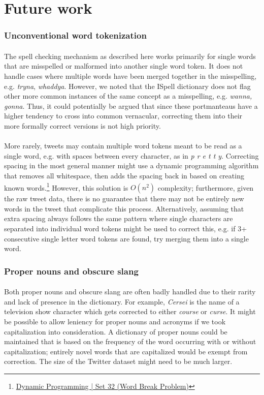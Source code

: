 \documentclass[twocolumn,10pt]{article}
\begin{document}
\section*{Future work}
\subsubsection*{Unconventional word tokenization}
\paragraph{} The spell checking mechanism as described here works primarily for single words that are misspelled or malformed into another single word token. It does not handle cases where multiple words have been merged together in the misspelling, e.g. \textit{tryna}, \textit{whaddya}. However, we noted that the ISpell dictionary does not flag other more common instances of the same concept as a misspelling, e.g. \textit{wanna, gonna}. Thus, it could potentially be argued that since these portmanteaus have a higher tendency to cross into common vernacular, correcting them into their more formally correct versions is not high priority.
\paragraph{} More rarely, tweets may contain multiple word tokens meant to be read as a single word, e.g. with spaces between every character, as in \textit{p r e t t y}. Correcting spacing in the most general manner might use a dynamic programming algorithm that removes all whitespace, then adds the spacing back in based on creating known words.\footnote{\href{http://www.geeksforgeeks.org/dynamic-programming-set-32-word-break-problem/}{Dynamic Programming | Set 32 (Word Break Problem)}} However, this solution is $O(n^2)$ complexity; furthermore, given the raw tweet data, there is no guarantee that there may not be entirely new words in the tweet that complicate this process. Alternatively, assuming that extra spacing always follows the same pattern where single characters are separated into individual word tokens might be used to correct this, e.g. if 3+ consecutive single letter word tokens are found, try merging them into a single word.
\subsubsection*{Proper nouns and obscure slang}
\paragraph{} Both proper nouns and obscure slang are often badly handled due to their rarity and lack of presence in the dictionary. For example, \textit{Cersei} is the name of a television show character which gets corrected to either \textit{course} or \textit{curse}. It might be possible to allow leniency for proper nouns and acronyms if we took capitalization into consideration. A dictionary of proper nouns could be maintained that is based on the frequency of the word occurring with or without capitalization; entirely novel words that are capitalized would be exempt from correction. The size of the Twitter dataset might need to be much larger.
\end{document}
